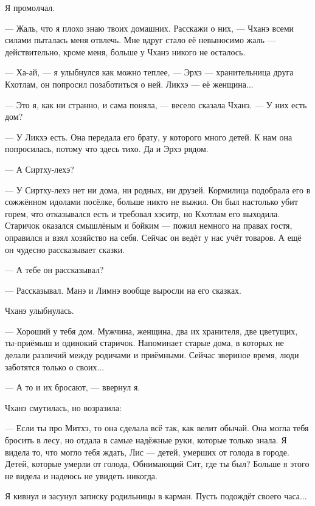Я промолчал.

--- Жаль, что я плохо знаю твоих домашних.
Расскажи о них, --- Чханэ всеми силами пыталась меня отвлечь.
Мне вдруг стало её невыносимо жаль --- действительно, кроме меня, больше у Чханэ никого не осталось.

--- Ха-ай, --- я улыбнулся как можно теплее, --- Эрхэ --- хранительница друга Кхотлам, он попросил позаботиться о ней.
Ликхэ --- её женщина...

--- Это я, как ни странно, и сама поняла, --- весело сказала Чханэ.
--- У них есть дом?

--- У Ликхэ есть.
Она передала его брату, у которого много детей.
К нам она попросилась, потому что здесь тихо.
Да и Эрхэ рядом.

--- А Сиртху-лехэ?

--- У Сиртху-лехэ нет ни дома, ни родных, ни друзей.
Кормилица подобрала его в сожжённом идолами посёлке, больше никто не выжил.
Он был настолько убит горем, что отказывался есть и требовал хэситр, но Кхотлам его выходила.
Старичок оказался смышлёным и бойким --- пожил немного на правах гостя, оправился и взял хозяйство на себя.
Сейчас он ведёт у нас учёт товаров.
А ещё он чудесно рассказывает сказки.

--- А тебе он рассказывал?

--- Рассказывал.
Манэ и Лимнэ вообще выросли на его сказках.

Чханэ улыбнулась.

--- Хороший у тебя дом.
Мужчина, женщина, два их хранителя, две цветущих\FM, ты-приёмыш и одинокий старичок.
Напоминает старые дома, в которых не делали различий между родичами и приёмными.
Сейчас звериное время, люди заботятся только о своих...

--- А то и их бросают, --- ввернул я.

Чханэ смутилась, но возразила:

--- Если ты про Митхэ, то она сделала всё так, как велит обычай.
Она могла тебя бросить в лесу, но отдала в самые надёжные руки, которые только знала.
Я видела то, что могло тебя ждать, Лис --- детей, умерших от голода в городе.
Детей, которые умерли от голода, Обнимающий Сит, где ты был?
Больше я этого не видела и надеюсь не увидеть никогда.

Я кивнул и засунул записку родильницы в карман.
Пусть подождёт своего часа...

